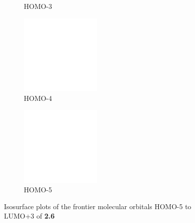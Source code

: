 \begin{figure}[!ht]
\begin{subfigure}[b]{0.31\textwidth}
  \caption{HOMO-3}
 \end{subfigure}
 \begin{subfigure}[b]{0.31\textwidth}
  \includegraphics[clip=true, width=\textwidth, height=39mm, keepaspectratio]{images/mos/6h-4.eps}
  \caption{HOMO-4}
 \end{subfigure}
 \begin{subfigure}[b]{0.31\textwidth}
  \includegraphics[clip=true, width=\textwidth, height=39mm, keepaspectratio]{images/mos/6h-5.eps}
  \caption{HOMO-5}
 \end{subfigure}
\caption[Molecular orbitals HOMO-5 to LUMO+3 of \textbf{2.6}]{Isosurface plots of the frontier molecular orbitals HOMO-5 to LUMO+3 of \textbf{2.6}}
\label{fig.mo26}
\end{figure}

